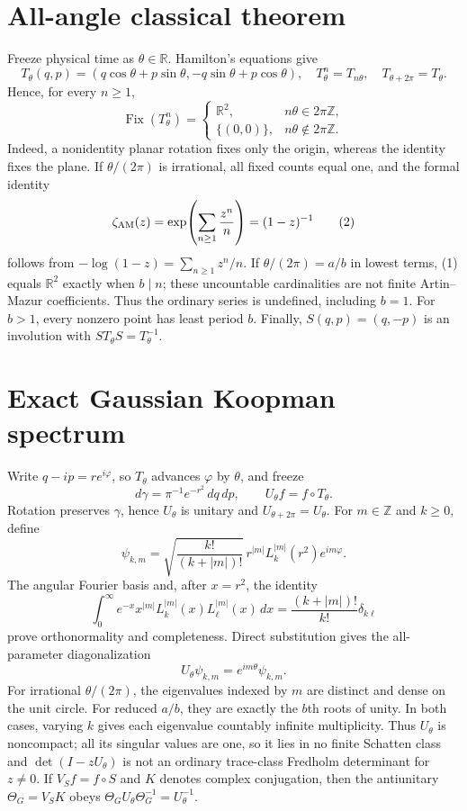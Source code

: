 \documentclass[10pt]{article}
\begin{document}
\section{All-angle classical theorem}
Freeze physical time as $\theta\in\mathbb R$.  Hamilton's equations give
\[
T_\theta(q,p)=(q\cos\theta+p\sin\theta,
-q\sin\theta+p\cos\theta),\quad T_\theta^n=T_{n\theta},\quad
T_{\theta+2\pi}=T_\theta.
\]
Hence, for every $n\ge1$,
\[
\operatorname{Fix}(T_\theta^n)=
\begin{cases}
\mathbb R^2,&n\theta\in2\pi\mathbb Z,\\
\{(0,0)\},&n\theta\notin2\pi\mathbb Z.
\end{cases}\tag{1}
\]
Indeed, a nonidentity planar rotation fixes only the origin, whereas the
identity fixes the plane.  If $\theta/(2\pi)$ is irrational, all fixed
counts equal one, and the formal identity
\[
\zeta_{\rm AM}(z)=\exp\!\left(\sum_{n\ge1}\frac{z^n}{n}\right)
=(1-z)^{-1}\tag{2}
\]
follows from $-\log(1-z)=\sum_{n\ge1}z^n/n$.  If
$\theta/(2\pi)=a/b$ in lowest terms, (1) equals $\mathbb R^2$ exactly when
$b\mid n$; these uncountable cardinalities are not finite Artin--Mazur
coefficients.  Thus the ordinary series is undefined, including $b=1$.
For $b>1$, every nonzero point has least period $b$.  Finally,
$S(q,p)=(q,-p)$ is an involution with $ST_\theta S=T_\theta^{-1}$.

\section{Exact Gaussian Koopman spectrum}
Write $q-ip=re^{i\varphi}$, so $T_\theta$ advances $\varphi$ by $\theta$,
and freeze
\[
d\gamma=\pi^{-1}e^{-r^2}\,dq\,dp,\qquad
U_\theta f=f\circ T_\theta .
\]
Rotation preserves $\gamma$, hence $U_\theta$ is unitary and
$U_{\theta+2\pi}=U_\theta$.  For
$m\in\mathbb Z$ and $k\ge0$, define
\[
\psi_{k,m}=\sqrt{\frac{k!}{(k+|m|)!}}\,
r^{|m|}L_k^{|m|}(r^2)e^{im\varphi}.
\]
The angular Fourier basis and, after $x=r^2$, the identity
\[
\int_0^\infty e^{-x}x^{|m|}L_k^{|m|}(x)L_\ell^{|m|}(x)\,dx
=\frac{(k+|m|)!}{k!}\delta_{k\ell}
\]
prove orthonormality and completeness.  Direct substitution gives the
all-parameter diagonalization
\[
U_\theta\psi_{k,m}=e^{im\theta}\psi_{k,m}.\tag{3}
\]
For irrational $\theta/(2\pi)$, the eigenvalues indexed by $m$ are distinct
and dense on the unit circle.  For reduced $a/b$, they are exactly the
$b$th roots of unity.  In both cases, varying $k$ gives each eigenvalue
countably infinite multiplicity.  Thus $U_\theta$ is noncompact; all its
singular values are one, so it lies in no finite Schatten class and
$\det(I-zU_\theta)$ is not an ordinary trace-class Fredholm determinant for
$z\ne0$.  If $V_Sf=f\circ S$ and $K$ denotes complex conjugation, then the
antiunitary $\Theta_G=V_SK$ obeys
$\Theta_GU_\theta\Theta_G^{-1}=U_\theta^{-1}$.
\end{document}
